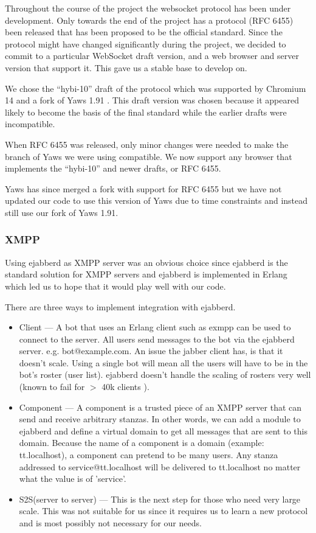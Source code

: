 \documentclass[11pt,a4paper]{report}
\begin{document}
Throughout the course of the project the websocket protocol has
been under development. Only towards the end of the project has a protocol
(RFC 6455) been released that has been proposed to be the official standard.
Since the protocol might have changed significantly during the project, we
decided to commit to a particular WebSocket draft version, and a web browser and
server version that support it. This gave us a stable base to develop on.

We chose the ``hybi-10'' draft of the protocol \cite{hybi-10} which was
supported by Chromium 14 and a fork of Yaws 1.91 \cite{yaws-fork}. This draft
version was chosen because it appeared likely to become the basis of the final
standard \cite{new-websocket-google-blog} while the earlier drafts were
incompatible.

When RFC 6455 was released, only minor changes were needed to make the branch of
Yaws we were using compatible. We now support any browser that implements
the ``hybi-10'' and newer drafts, or RFC 6455.

Yaws has since merged a fork with support for RFC 6455 but we have not updated
our code to use this version of Yaws due to time constraints and instead still
use our fork of Yaws 1.91\cite{our-yaws}.


\subsubsection{XMPP}
Using ejabberd\cite{ejabberd} as XMPP server was an obvious choice since ejabberd is the
standard solution for XMPP servers and ejabberd is implemented
in Erlang which led us to hope that it would play well with our code.

There are three ways to implement integration with ejabberd.

\begin{itemize}
\item Client --- A bot that uses an Erlang client such as exmpp\cite{exmpp} can be used to
connect to the server.
All users send messages to the bot via the ejabberd server. e.g. bot@example.com.
An issue the jabber client has, is that it doesn’t scale. Using a single bot
will mean all the users will have to be in the bot’s roster (user list).
ejabberd doesn’t handle the scaling of rosters very well (known to fail for
$>$ 40k clients \cite{40k-roster}).
\item Component --- A component is a trusted piece of an XMPP server that can send
and receive arbitrary stanzas.
In other words, we can add a module to ejabberd and define a virtual domain to
get all messages that are sent to this domain.
Because the name of a component is a domain (example: tt.localhost), a component
can pretend to be many users.
Any stanza addressed to service@tt.localhost will be delivered to tt.localhost
no matter what the value is of 'service'.
\item S2S(server to server) --- This is the next step for those who need very
large scale. This was not suitable for us since it requires us to learn a new
protocol and is most possibly not necessary for our needs.
\end{itemize}
\end{document}
